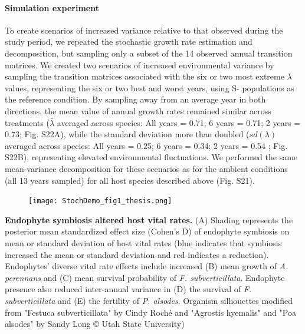 \documentclass[12pt]{article}
\begin{document}
\paragraph*{Simulation experiment} To create scenarios of increased variance relative to that observed during the study period, we repeated the stochastic growth rate estimation and decomposition, but sampling only a subset of the 14 observed annual transition matrices. 
We created two scenarios of increased environmental variance by sampling the transition matrices associated with the six or two most extreme $\lambda$ values, representing the six or two best and worst years, using S- populations as the reference condition. 
By sampling away from an average year in both directions, the mean value of annual growth rates remained similar across treatments ($\bar{\lambda}$ averaged across species: All years = 0.71; 6 years = 0.71; 2 years = 0.73; Fig. S22A), while the standard deviation more than doubled ($sd(\lambda)$ averaged across species: All years = 0.25; 6 years = 0.34; 2 years = 0.54 ; Fig. S22B), representing elevated environmental fluctuations.
We performed the same mean-variance decomposition for these scenarios as for the ambient conditions (all 13 years sampled) for all host species described above (Fig. S21). 









\clearpage


\begin{figure}
	\centering
	\texttt{[image: StochDemo\_fig1\_thesis.png]}
\end{figure}
 \textbf{Endophyte symbiosis altered host vital rates.} (A) Shading represents the posterior mean standardized effect size (Cohen's D) of endophyte symbiosis on mean or standard deviation of host vital rates (blue indicates that symbiosis increased the mean or standard deviation and red indicates a reduction). Endophytes' diverse vital rate effects include increased (B) mean growth of \emph{A. perennans} and (C) mean survival probability of \emph{F. subverticillata}. Endophyte presence also reduced inter-annual variance in (D) the survival of \emph{F. subverticillata} and (E) the fertility of \emph{P. alsodes}. Organism silhouettes modified from "Festuca subverticillata" by Cindy Roché and "Agrostis hyemalis" and "Poa alsodes" by Sandy Long © Utah State University)
\newpage
\end{document}
